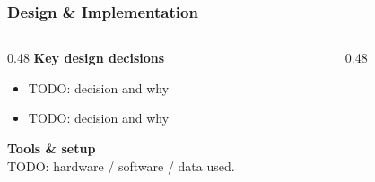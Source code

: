 
\begin{frame}
	\frametitle{Design \& Implementation}

	\begin{columns}[T]
		\begin{column}{0.48\linewidth}
			\textbf{Key design decisions}

			\begin{itemize}
				\item TODO: decision and why
				\item TODO: decision and why
			\end{itemize}

			\textbf{Tools \& setup}\\
			TODO: hardware / software / data used.
		\end{column}
		\begin{column}{0.48\linewidth}
		\end{column}
	\end{columns}
\end{frame}
